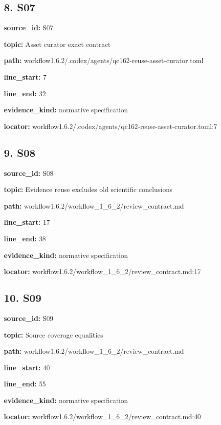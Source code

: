 \documentclass[10pt,a4paper]{article}
\begin{document}
\subsection*{8.\allowbreak{} S07}
\textbf{source\_\allowbreak{}id:} S07\par
\textbf{topic:} Asset curator exact contract\par
\textbf{path:} workflow1.\allowbreak{}6.\allowbreak{}2/\allowbreak{}.\allowbreak{}codex/\allowbreak{}agents/\allowbreak{}qc162-\allowbreak{}reuse-\allowbreak{}asset-\allowbreak{}curator.\allowbreak{}toml\par
\textbf{line\_\allowbreak{}start:} 7\par
\textbf{line\_\allowbreak{}end:} 32\par
\textbf{evidence\_\allowbreak{}kind:} normative specification\par
\textbf{locator:} workflow1.\allowbreak{}6.\allowbreak{}2/\allowbreak{}.\allowbreak{}codex/\allowbreak{}agents/\allowbreak{}qc162-\allowbreak{}reuse-\allowbreak{}asset-\allowbreak{}curator.\allowbreak{}toml:7\par
\subsection*{9.\allowbreak{} S08}
\textbf{source\_\allowbreak{}id:} S08\par
\textbf{topic:} Evidence reuse excludes old scientific conclusions\par
\textbf{path:} workflow1.\allowbreak{}6.\allowbreak{}2/\allowbreak{}workflow\_\allowbreak{}1\_\allowbreak{}6\_\allowbreak{}2/\allowbreak{}review\_\allowbreak{}contract.\allowbreak{}md\par
\textbf{line\_\allowbreak{}start:} 17\par
\textbf{line\_\allowbreak{}end:} 38\par
\textbf{evidence\_\allowbreak{}kind:} normative specification\par
\textbf{locator:} workflow1.\allowbreak{}6.\allowbreak{}2/\allowbreak{}workflow\_\allowbreak{}1\_\allowbreak{}6\_\allowbreak{}2/\allowbreak{}review\_\allowbreak{}contract.\allowbreak{}md:17\par
\subsection*{10.\allowbreak{} S09}
\textbf{source\_\allowbreak{}id:} S09\par
\textbf{topic:} Source coverage equalities\par
\textbf{path:} workflow1.\allowbreak{}6.\allowbreak{}2/\allowbreak{}workflow\_\allowbreak{}1\_\allowbreak{}6\_\allowbreak{}2/\allowbreak{}review\_\allowbreak{}contract.\allowbreak{}md\par
\textbf{line\_\allowbreak{}start:} 40\par
\textbf{line\_\allowbreak{}end:} 55\par
\textbf{evidence\_\allowbreak{}kind:} normative specification\par
\textbf{locator:} workflow1.\allowbreak{}6.\allowbreak{}2/\allowbreak{}workflow\_\allowbreak{}1\_\allowbreak{}6\_\allowbreak{}2/\allowbreak{}review\_\allowbreak{}contract.\allowbreak{}md:40\par
\end{document}
